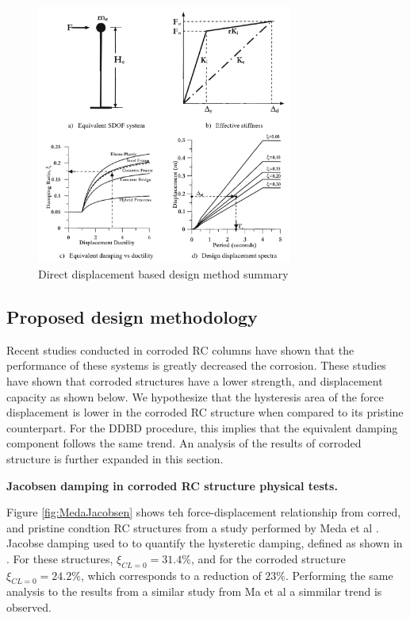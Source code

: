 \begin{figure}[htbp]
	\centering
	\includegraphics[width=0.75\textwidth]{VAC Prelim 2.0/Chapter-5/figs/DDBD.png}
	\caption{Direct displacement based design method summary \cite{Priestley2007}}
	\label{fig:DDBD_sum}
\end{figure}
\newpage

\subsection{Proposed design methodology}

Recent studies conducted in corroded RC columns have shown that the performance of these systems is greatly decreased the corrosion. These studies have shown that corroded structures have a lower strength, and displacement capacity as shown below. We hypothesize that the hysteresis area of the force displacement is lower in the corroded RC structure when compared to its pristine counterpart. For the DDBD procedure, this implies that the equivalent damping component follows the same trend. An analysis of the results of corroded structure is further expanded in this section. 

\textbf{Jacobsen damping in corroded RC structure physical tests.}

Figure \ref{fig:MedaJacobsen} shows teh force-displacement relationship from corred, and pristine condtion RC structures from a study performed by Meda et al \cite{Meda2014}. Jacobse damping used to to quantify the hysteretic damping, defined as shown in . For these structures, $\xi_{CL=0}=31.4\%$, and for the corroded structure $\xi_{CL=0}=24.2\%$, which corresponds to a reduction of $23\%$. Performing the same analysis to the results from a similar study from Ma et al \cite{Ma2012} a simmilar trend is observed.

